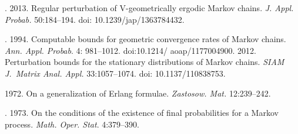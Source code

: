 \begin{multicols}{2}
{{\begin{thebibliography}{99}
. 2013.  Regular perturbation of
V-geometrically ergodic Markov chains. 
\textit{J. Appl. Probab.} 50:184--194. doi: 10.1239/jap/1363784432.

. 1994. Computable bounds for geometric
convergence rates of Markov chains. \textit{Ann. Appl. Probab}. 4: 981--1012. 
doi:10.1214/ aoap/1177004900.
 2012. Perturbation bounds for the stationary distributions of
Markov chains. \textit{SIAM J.~Matrix Anal. Appl.} 33:1057--1074. doi: 10.1137/110838753.

 1972. On a generalization of Erlang formulae.
\textit{Zastosow. Mat.} 12:239--242.

. 1973. On the conditions of the existence of
final probabilities for a Markov process. \textit{Math. Oper. Stat}. 4:379--390.


\end{thebibliography}}}
\end{multicols}

